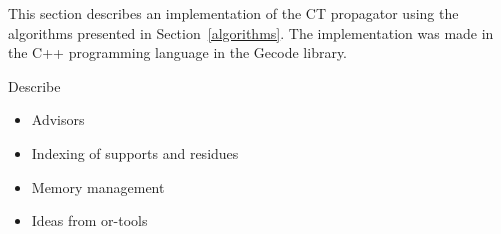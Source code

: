 \documentclass[a4paper,11pt]{article}
\newcommand{\Todo}[1]{{\color{blue}#1}}
\newcommand{\Chapref}[1]{Section~\ref{#1}}
\numberwithin{equation}{section}
\begin{document}



This section describes an implementation of the CT propagator using the algorithms
presented in \Chapref{algorithms}. The implementation was made in the C++ programming
language in the Gecode library.

\Todo{
  Describe
  \begin{itemize}
    \item Advisors
    \item Indexing of supports and residues
    \item Memory management
    \item Ideas from or-tools
  \end{itemize}
}
\end{document}

